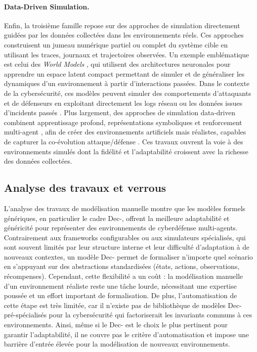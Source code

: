 \paragraph{Data-Driven Simulation.}
Enfin, la troisième famille repose sur des approches de simulation directement guidées par les données collectées dans les environnements réels. Ces approches construisent un jumeau numérique partiel ou complet du système cible en utilisant les traces, journaux et trajectoires observées. Un exemple emblématique est celui des \textit{World Models} \cite{Ha2018}, qui utilisent des architectures neuronales pour apprendre un espace latent compact permettant de simuler et de généraliser les dynamiques d’un environnement à partir d’interactions passées. Dans le contexte de la cybersécurité, ces modèles peuvent simuler des comportements d’attaquants et de défenseurs en exploitant directement les logs réseau ou les données issues d’incidents passés \cite{D2mbiT0vgP4J}. Plus largement, des approches de simulation data-driven combinent apprentissage profond, représentations symboliques et renforcement multi-agent \cite{5oUSbVbTXX0J, RQyw5NYMj-wJ}, afin de créer des environnements artificiels mais réalistes, capables de capturer la co-évolution attaque/défense \cite{oOfK6FXUSCAJ}. Ces travaux ouvrent la voie à des environnements simulés dont la fidélité et l’adaptabilité croissent avec la richesse des données collectées.

\subsection*{Analyse des travaux et verrous}

L’analyse des travaux de modélisation manuelle montre que les modèles formels génériques, en particulier le cadre Dec-, offrent la meilleure adaptabilité et généricité pour représenter des environnements de cyberdéfense multi-agents. Contrairement aux frameworks configurables ou aux simulateurs spécialisés, qui sont souvent limités par leur structure interne et leur difficulté d’adaptation à de nouveaux contextes, un modèle Dec- permet de formaliser n’importe quel scénario en s’appuyant sur des abstractions standardisées (états, actions, observations, récompenses). Cependant, cette flexibilité a un coût : la modélisation manuelle d’un environnement réaliste reste une tâche lourde, nécessitant une expertise poussée et un effort important de formalisation. De plus, l’automatisation de cette étape est très limitée, car il n’existe pas de bibliothèque de modèles Dec- pré-spécialisés pour la cybersécurité qui factoriserait les invariants communs à ces environnements. Ainsi, même si le Dec- est le choix le plus pertinent pour garantir l’adaptabilité, il ne couvre pas le critère d’automatisation et impose une barrière d’entrée élevée pour la modélisation de nouveaux environnements.

